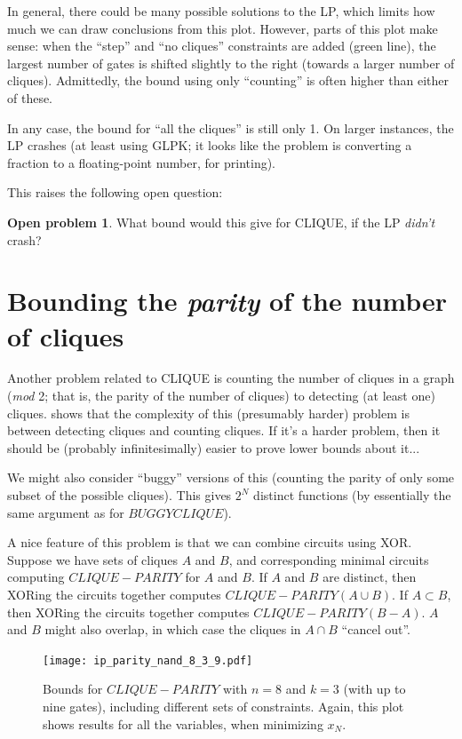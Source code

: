 \documentclass[12pt]{article}
\theoremstyle{definition}
\newtheorem{prob}{Open problem}[section]
\begin{document}
In general, there could be many possible solutions to the LP, which
limits how much we can draw conclusions from this plot.  However,
parts of this plot make sense: when the ``step'' and ``no cliques''
constraints are added (green line), the largest number of gates is
shifted slightly to the right (towards a larger number of cliques).
Admittedly, the bound using only ``counting'' is often higher than
either of these.

In any case, the bound for ``all the cliques'' is still only 1.  On
larger instances, the LP crashes (at least using GLPK; it looks
like the problem is converting a fraction to a floating-point number,
for printing).

This raises the following open question:

\begin{prob}
What bound would this give for CLIQUE, if the LP {\em didn't} crash?
\end{prob}


\section{Bounding the {\em parity} of the number of cliques}

Another problem related to CLIQUE is 
counting the number of cliques in a graph ({\em mod} 2; that is, the parity
of the number of cliques) to
detecting (at least one) cliques.
\cite{goldreich2025counting} shows that the complexity of this (presumably harder)
problem is between detecting cliques and counting cliques. If it's a harder
problem, then it should be (probably infinitesimally) easier to prove lower bounds
about it...

We might also consider ``buggy'' versions of this (counting the parity of only
some subset of the possible cliques). This gives $2^N$ distinct functions (by
essentially the same argument as for $BUGGYCLIQUE$).

A nice feature of this problem is that we can combine circuits using XOR.
Suppose we have sets of cliques $A$ and $B$, and corresponding minimal circuits
computing $CLIQUE-PARITY$ for $A$ and $B$. If $A$ and $B$ are distinct, then
XORing the circuits together computes $CLIQUE-PARITY(A \cup B)$. If $A \subset B$,
then XORing the circuits together computes $CLIQUE-PARITY(B-A)$. $A$ and $B$ might
also overlap, in which case the cliques in $A \cap B$ ``cancel out''.

\begin{figure}

\centering

\texttt{[image: ip\_parity\_nand\_8\_3\_9.pdf]}

\caption{ Bounds for $CLIQUE-PARITY$ with $n=8$ and $k=3$ (with up to nine gates),
including different sets of constraints.  Again, this plot shows
results for all the variables, when minimizing $x_N$.}
\label{fig:bounds0}

\end{figure}
\end{document}
